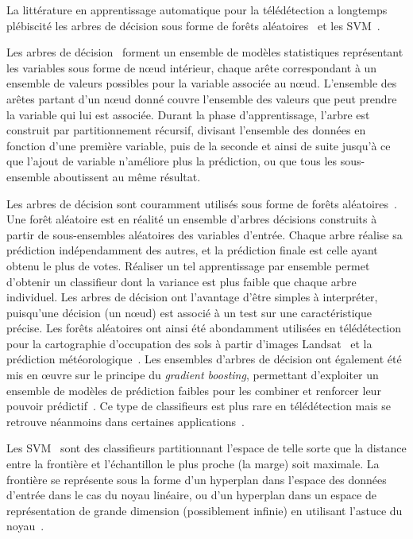 La littérature en apprentissage automatique pour la télédétection a longtemps plébiscité les arbres de décision sous forme de forêts aléatoires~\cite{breiman_random_2001} et les \gls{SVM}~\cite{boser_training_1992,cortes_support-vector_1995}.

Les arbres de décision~\cite{breiman_classification_2017} forment un ensemble de modèles statistiques représentant les variables sous forme de n\oe{}ud intérieur, chaque arête correspondant à un ensemble de valeurs possibles pour la variable associée au n\oe{}ud. L'ensemble des arêtes partant d'un n\oe{}ud donné couvre l'ensemble des valeurs que peut prendre la variable qui lui est associée. Durant la phase d'apprentissage, l'arbre est construit par partitionnement récursif, divisant l'ensemble des données en fonction d'une première variable, puis de la seconde et ainsi de suite jusqu'à ce que l'ajout de variable n'améliore plus la prédiction, ou que tous les sous-ensemble aboutissent au même résultat.

Les arbres de décision sont couramment utilisés sous forme de forêts aléatoires~\cite{breiman_random_2001}. Une forêt aléatoire est en réalité un ensemble d'arbres décisions construits à partir de sous-ensembles aléatoires des variables d'entrée. Chaque arbre réalise sa prédiction indépendamment des autres, et la prédiction finale est celle ayant obtenu le plus de votes. Réaliser un tel apprentissage par ensemble permet d'obtenir un classifieur dont la variance est plus faible que chaque arbre individuel. Les arbres de décision ont l'avantage d'être simples à interpréter, puisqu'une décision (un n\oe{}ud) est associé à un test sur une caractéristique précise. Les forêts aléatoires ont ainsi été abondamment utilisées en télédétection pour la cartographie d'occupation des sols à partir d'images \gls{Landsat}~\cite{pal_random_2005} et la prédiction météorologique~\cite{lary_machine_2016}. Les ensembles d'arbres de décision ont également été mis en \oe{}uvre sur le principe du \emph{gradient boosting}, permettant d'exploiter un ensemble de modèles de prédiction faibles pour les combiner et renforcer leur pouvoir prédictif~\cite{friedman_greedy_2001}. Ce type de classifieurs est plus rare en télédétection mais se retrouve néanmoins dans certaines applications~\cite{lawrence_classification_2004}.

Les \gls{SVM}~\cite{boser_training_1992,cortes_support-vector_1995} sont des classifieurs partitionnant l'espace de telle sorte que la distance entre la frontière et l'échantillon le plus proche (la marge) soit maximale. La frontière se représente sous la forme d'un hyperplan dans l'espace des données d'entrée dans le cas du noyau linéaire, ou d'un hyperplan dans un espace de représentation de grande dimension (possiblement infinie) en utilisant l'astuce du noyau~\cite{boser_training_1992}.

